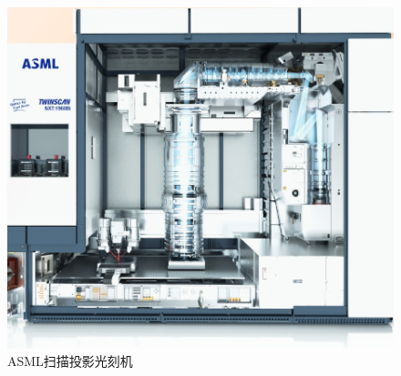 \begin{figure}[!t]
	\centering
	\includegraphics[width=12cm]{figures/光刻原理图2}
	\caption{ASML扫描投影光刻机}
	\label{光刻原理图1}
\end{figure}


